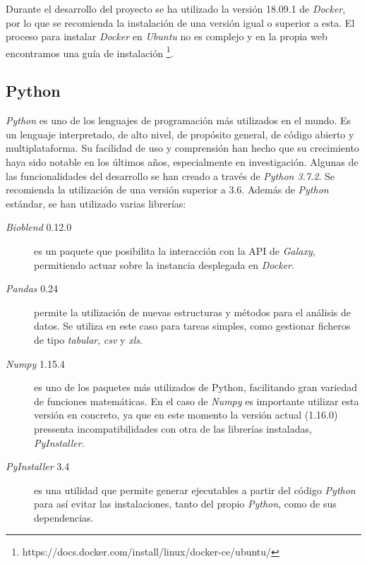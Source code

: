     Durante el desarrollo del proyecto se ha utilizado la versión 18.09.1 de \textit{Docker}, por lo que se recomienda la instalación de una versión igual o superior a esta. El proceso para instalar \textit{Docker} en \textit{Ubuntu} no es complejo y en la propia web encontramos una guía de instalación \footnote{https://docs.docker.com/install/linux/docker-ce/ubuntu/}.


    \subsection{Python}
    \textit{Python} es uno de los lenguajes de programación más utilizados en el mundo. Es un lenguaje interpretado, de alto nivel, de propósito general, de código abierto y multiplataforma. Su facilidad de uso y comprensión han hecho que su crecimiento haya sido notable en los últimos años, especialmente en investigación.
    Algunas de las funcionalidades del desarrollo se han creado a través de \textit{Python 3.7.2}. Se recomienda la utilización de una versión superior a 3.6. Además de \textit{Python} estándar, se han utilizado varias librerías:
        \begin{description}
            
            \item[\textit{Bioblend} 0.12.0] es un paquete que posibilita la interacción con la API de \textit{Galaxy}, permitiendo actuar sobre la instancia desplegada en \textit{Docker}.
            
            \item[\textit{Pandas} 0.24] permite la utilización de nuevas estructuras y métodos para el análisis de datos. Se utiliza en este caso para tareas simples, como gestionar ficheros de tipo \textit{tabular}, \textit{csv} y \textit{xls}.
            
            \item[\textit{Numpy} 1.15.4] es uno de los paquetes más utilizados de Python, facilitando gran variedad de funciones matemáticas. En el caso de \textit{Numpy} es importante utilizar esta versión en concreto, ya que en este momento la versión actual (1.16.0) pressenta incompatibilidades con otra de las librerías instaladas, \textit{PyInstaller}.
            
            \item[\textit{PyInstaller} 3.4] es una utilidad que permite generar ejecutables a partir del código \textit{Python} para así evitar las instalaciones, tanto del propio \textit{Python}, como de sus dependencias.
        
        \end{description}
    

